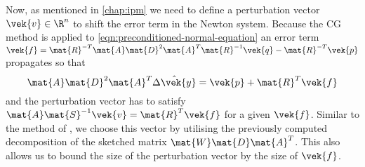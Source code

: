 Now, as mentioned in \cref{chap:ipm} we need to define a perturbation vector \(\vek{v} \in \R^n\) to shift the error term in the Newton system.
Because the CG method is applied to \cref{eqn:preconditioned-normal-equation} an error term \(\vek{f} = \mat{R}^{-T}\mat{A}\mat{D}^2\mat{A}^T\mat{R}^{-1}\vek{q} - \mat{R}^{-T}\vek{p}\) propagates so that
\begin{equation}
  \mat{A} \mat{D}^2 \mat{A}^T \hat{\Delta\vek{y}} = \vek{p} + \mat{R}^T\vek{f}
\end{equation}
and the perturbation vector has to satisfy \(\mat{A}\mat{S}^{-1}\vek{v} = \mat{R}^T \vek{f}\) for a given \(\vek{f}\).
Similar to the method of \textcite{Avron-FasterRandomizedInfeasibleIPMs}, we choose this vector by utilising the previously computed decomposition of the sketched matrix \(\mat{W}\mat{D}\mat{A}^T\).
This also allows us to bound the size of the perturbation vector by the size of \(\vek{f}\).

